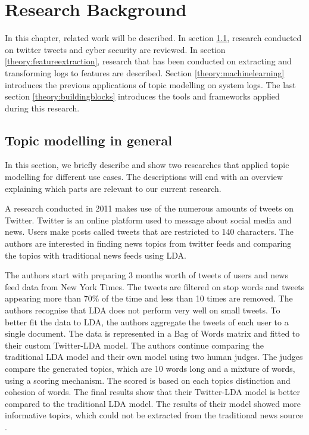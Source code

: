 \chapter{Research Background}  \label{ch:theory}

\begin{comment}
\section{definitions}
\end{comment}

In this chapter, related work will be described. In section \ref{theory:relatedwork}, research conducted on twitter tweets and cyber security are reviewed. In section \ref{theory:featureextraction}, research that has been conducted on extracting and transforming logs to features are described. Section \ref{theory:machinelearning} introduces the previous applications of topic modelling on system logs. The last section \ref{theory:buildingblocks} introduces the tools and frameworks applied during this research.

\section{Topic modelling in general} \label{theory:relatedwork}
In this section, we briefly describe and show two researches that applied topic modelling for different use cases. The descriptions will end with an overview explaining which parts are relevant to our current research. \par

\setlength{\parindent}{3ex} A research conducted in 2011 makes use of the numerous amounts of tweets on Twitter. Twitter is an online platform used to message about social media and news. Users make posts called tweets that are restricted to 140 characters. The authors are interested in finding news topics from twitter feeds and comparing the topics with traditional news feeds using LDA.

The authors start with preparing 3 months worth of tweets of users and news feed data from New York Times. The tweets are filtered on stop words and tweets appearing more than 70\% of the time and less than 10 times are removed. The authors recognise that LDA does not perform very well on small tweets. To better fit the data to LDA, the authors aggregate the tweets of each user to a single document. The data is represented in a Bag of Words matrix and fitted to their custom Twitter-LDA model. The authors continue comparing the traditional LDA model and their own model using two human judges. The judges compare the generated topics, which are 10 words long and a mixture of words, using a scoring mechanism. The scored is based on each topics distinction and cohesion of words. The final results show that their Twitter-LDA model is better compared to the traditional LDA model. The results of their model showed more informative topics, which could  not be extracted from the traditional news source \cite{Zhao2011ComparingModels}. 

